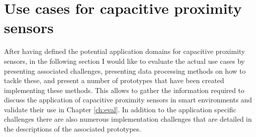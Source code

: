 \chapter{Use cases for capacitive proximity sensors}
\label{ch:usecases}
After having defined the potential application domains for capacitive proximity sensors, in the following section I would like to evaluate the actual use cases by presenting associated challenges, presenting data processing methods on how to tackle these, and present a number of prototypes that have been created implementing these methods. This allows to gather the information required to discuss the application of capacitive proximity sensors in smart environments and validate their use in Chapter \ref{ch:eval}. In addition to the application specific challenges there are also numerous implementation challenges that are detailed in the descriptions of the associated prototypes.


\clearpage
